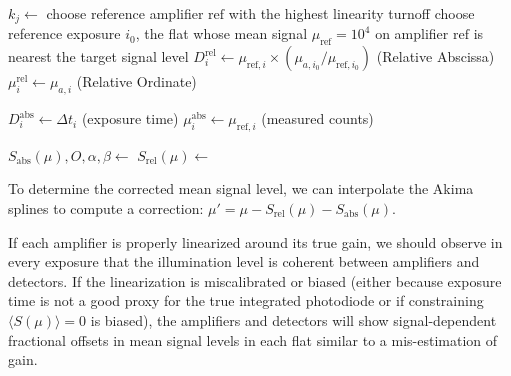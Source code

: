 \begin{algorithm}[H]
\caption{Double-spline linearity fit (single detector)}
\label{alg:linearity-double-spline}
\begin{algorithmic}[1]
    \State $k_j \leftarrow$ 
    \State {}
\EndFor
\State choose reference amplifier $\mathrm{ref}$ with the highest linearity turnoff
\State choose reference exposure $i_0$, the flat whose mean signal $\mu_{\mathrm{ref}} = 10^4$ on amplifier $\mathrm{ref}$ is nearest the target signal level
        \State $D^{\mathrm{rel}}_{i} \leftarrow \mu_{\mathrm{ref}, i} \times (\mu_{a,i_0} / \mu_{\mathrm{ref}, i_0})$  (Relative Abscissa) %
        \State $\mu^{\mathrm{rel}}_{i} \leftarrow \mu_{a,i}$ (Relative Ordinate)
    \EndFor

    \State $D^{\mathrm{abs}}_{i} \leftarrow \Delta t_i$ (exposure time)
    \State $\mu^{\mathrm{abs}}_{i} \leftarrow \mu_{\mathrm{ref},i}$ (measured counts)
\EndFor

\Statex {}
\State $S_{\mathrm{abs}}(\mu), O, \alpha, \beta \leftarrow$ 
\State $S_{\mathrm{rel}}(\mu) \leftarrow$ 
\end{algorithmic}
\end{algorithm}

To determine the corrected mean signal level, we can interpolate the Akima splines to compute a correction: $\mu' = \mu - S_{\mathrm{rel}}(\mu) - S_{\mathrm{abs}}(\mu)$.

If each amplifier is properly linearized around its true gain, we should observe in every exposure that the illumination level is coherent between amplifiers and detectors.
If the linearization is miscalibrated or biased (either because exposure time is not a good proxy for the true integrated photodiode or if constraining $\langle S(\mu)\rangle = 0$ is biased), the amplifiers and detectors will show signal-dependent fractional offsets in mean signal levels in each flat similar to a mis-estimation of gain.

